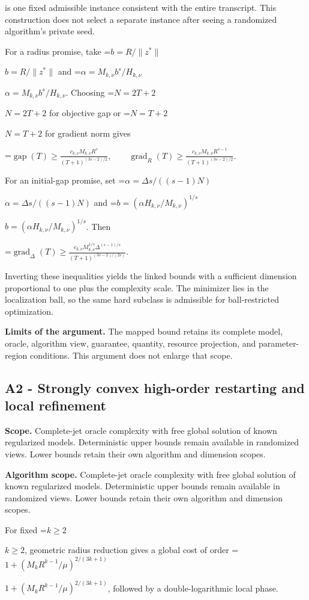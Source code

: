 \documentclass[10pt,a4paper]{article}
\newcommand{\AtlasMath}[1]{\par\begingroup\centering\setbox0=\hbox{$\displaystyle #1$}\ifdim\wd0>1.4\linewidth\typeout{ATLAS WIDE FORMULA: \the\wd0}\fi\ifdim\wd0>\linewidth\resizebox{\linewidth}{!}{\box0}\else\box0\fi\par\endgroup}
\newcommand{\AtlasInlineMath}[1]{\begingroup\setbox0=\hbox{$#1$}\ifdim\wd0>.4\linewidth\endgroup\AtlasMath{#1}\else\endgroup$#1$\fi}
\begin{document}
is one fixed admissible instance consistent with the entire transcript. This construction does not select a separate instance after seeing a randomized algorithm's private seed.

For a radius promise, take \AtlasInlineMath{b=R/\|z^*\|} and \AtlasInlineMath{\alpha=M_{k,\nu}b^s/H_{k,\nu}}. Choosing \AtlasInlineMath{N=2T+2} for objective gap or \AtlasInlineMath{N=T+2} for gradient norm gives

\AtlasMath{\operatorname{gap}(T)\ge\frac{c_{k,\nu}M_{k,\nu}R^s}{(T+1)^{(3s-2)/2}},\qquad
\operatorname{grad}_R(T)\ge\frac{c_{k,\nu}M_{k,\nu}R^{s-1}}{(T+1)^{(3s-2)/2}}.}

For an initial-gap promise, set \AtlasInlineMath{\alpha=\Delta s/((s-1)N)} and \AtlasInlineMath{b=(\alpha H_{k,\nu}/M_{k,\nu})^{1/s}}. Then

\AtlasMath{\operatorname{grad}_\Delta(T)\ge\frac{c_{k,\nu}M_{k,\nu}^{1/s}\Delta^{(s-1)/s}}{(T+1)^{(3s-2)/(2s)}}.}

Inverting these inequalities yields the linked bounds with a sufficient dimension proportional to one plus the complexity scale. The minimizer lies in the localization ball, so the same hard subclass is admissible for ball-restricted optimization.

\textbf{Limits of the argument.} The mapped bound retains its complete model, oracle, algorithm view, guarantee, quantity, resource projection, and parameter-region conditions. This argument does not enlarge that scope.

\subsection{A2 - Strongly convex high-order restarting and local refinement}
\textbf{Scope.} Complete-jet oracle complexity with free global solution of known regularized models. Deterministic upper bounds remain available in randomized views. Lower bounds retain their own algorithm and dimension scopes.

\textbf{Algorithm scope.} Complete-jet oracle complexity with free global solution of known regularized models. Deterministic upper bounds remain available in randomized views. Lower bounds retain their own algorithm and dimension scopes.

For fixed \AtlasInlineMath{k\ge2}, geometric radius reduction gives a global cost of order \AtlasInlineMath{1+(M_kR^{k-1}/\mu)^{2/(3k+1)}}, followed by a double-logarithmic local phase.
\end{document}
